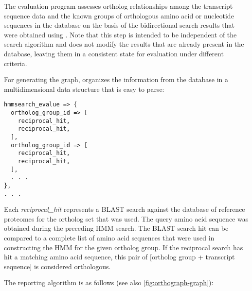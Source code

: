 \label{sec:algorithm-reporting}
The evaluation program  assesses ortholog
relationships among the transcript sequence data and the known groups of
orthologous amino acid or nucleotide sequences in the database on the basis of
the bidirectional search results that were obtained using
. Note that this step is intended to be independent of
the search algorithm and does not modify the results that are already present in
the database, leaving them in a consistent state for evaluation under different
criteria.

For generating the graph,  organizes the information
from the database in a multidimensional data structure that is easy to parse:

\begin{verbatim}
hmmsearch_evalue => {
  ortholog_group_id => [
    reciprocal_hit,
    reciprocal_hit,
  ],
  ortholog_group_id => [
    reciprocal_hit,
    reciprocal_hit,
  ],
  . . .
},
. . .
\end{verbatim}

Each \emph{reciprocal\_hit} represents a BLAST search against the database of
reference proteomes for the ortholog set that was used. The query amino acid
sequence was obtained during the preceding HMM search. The BLAST search hit can
be compared to a complete list of amino acid sequences that were used in
constructing the HMM for the given ortholog group. If the reciprocal search has
hit a matching amino acid sequence, this pair of [ortholog group + transcript
sequence] is considered orthologous.

The reporting algorithm is as follows (see also \autoref{fig:orthograph-graph}):

